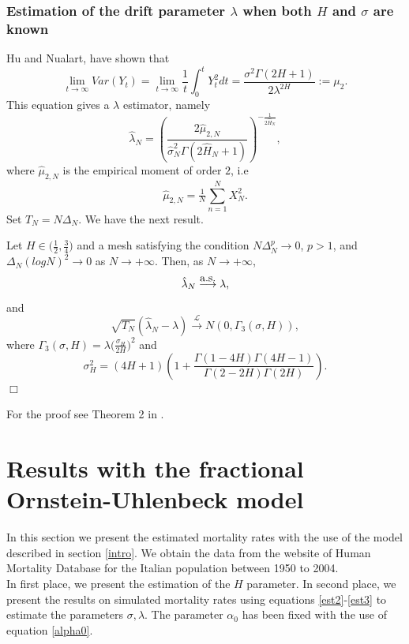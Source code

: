 \documentclass[smallextended]{svjour3}
\begin{document}
\subsubsection{Estimation of the drift parameter $\lambda$ when both $H$ and
$\sigma$ are known}

Hu and Nualart, \cite{hu-nu} have shown that
\[
\lim_{t\rightarrow \infty} Var (Y_t)= \lim_{t\rightarrow \infty}
\frac{1}{t}\int_0^t Y_t^2 dt = \frac{\sigma^2 \Gamma(2H+1) }
{2\lambda^{2H}}:=\mu_2.
\]
This equation gives a $\lambda$ estimator, namely
\begin{equation}
\hat{\lambda}_N = \left(\frac{2\hat{\mu}_{2,N}}{\hat{\sigma}_N^2
\Gamma(2\hat{H}_N+1) }  \right)^{-\tfrac{1}{2\hat{H}_N}},\label{est3}
\end{equation}
where $\hat{\mu}_{2,N}$ is the empirical moment of order $2$, i.e
\[
\hat{\mu}_{2,N} =\tfrac{1}{N}\sum_{n=1}^N X_N^2.
\]
Set $T_N=N\Delta_N$. We have the next result.
\begin{theorem}
    Let $H \in \big(\tfrac{1}{2} , \tfrac{3}{4}\big)$ and a mesh satisfying the
    condition $N \Delta_N^p\rightarrow 0$, $p>1$,
    and $ \Delta_N (log N )^2 \rightarrow 0$ as $N \rightarrow +\infty$. Then,
    as $N \rightarrow +\infty$,
    \[
    \hat{\lambda}_N \stackrel{\hbox{\rm a.s.}}{\longrightarrow}  \lambda,
    \]
    and
    \[
    \sqrt{T_N} ( \hat{\lambda}_N -\lambda)
    \stackrel{\mathcal{L}}{\longrightarrow} N (0, \Gamma_3 (\sigma,H)),
    \]
    where $\Gamma_3 (\sigma,H)=\lambda \big(\tfrac{\sigma_H}{2H} \big)^2$ and
    \[
    \sigma_H^2= (4H+1)\left(1+\frac{\Gamma(1-4H)\Gamma(4H-1)
    }{\Gamma(2-2H)\Gamma(2H)} \right).
    \]
    \hfill$\Box$
\end{theorem}
For the proof see Theorem 2 in \cite{br-ia}.\\







\section{Results with the fractional Ornstein-Uhlenbeck model}
\label{re-fou}

In this section we present the estimated mortality rates with the use of the
model
described in section \ref{intro}. We obtain the data from the website of Human
Mortality Database for the Italian population between 1950 to 2004.\\

In first place, we present the estimation of the $H$ parameter. In second
place, we present the results on simulated mortality rates using  equations
\eqref{est2}-\eqref{est3} to estimate the parameters $\sigma,\lambda$. The
parameter $\alpha_0$ has been fixed with the use of equation \eqref{alpha0}.\\
\end{document}
